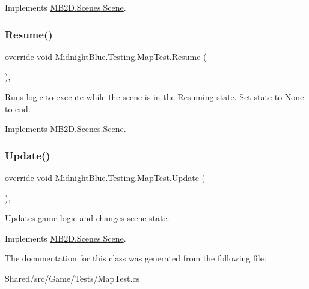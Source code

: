 Implements \hyperlink{class_m_b2_d_1_1_scenes_1_1_scene_a0661eff0223150fa8e9ea88145409e5d}{M\+B2\+D.\+Scenes.\+Scene}.

\hypertarget{class_midnight_blue_1_1_testing_1_1_map_test_aa595402e6d3702119877721f7cb3ab9f}{}\label{class_midnight_blue_1_1_testing_1_1_map_test_aa595402e6d3702119877721f7cb3ab9f} 
\subsubsection{\texorpdfstring{Resume()}{Resume()}}
{\footnotesize\ttfamily override void Midnight\+Blue.\+Testing.\+Map\+Test.\+Resume (\begin{DoxyParamCaption}{ }\end{DoxyParamCaption})\hspace{0.3cm}{\ttfamily [inline]}, {\ttfamily [virtual]}}



Runs logic to execute while the scene is in the Resuming state. Set state to None to end. 



Implements \hyperlink{class_m_b2_d_1_1_scenes_1_1_scene_ad13639db22b059a1b714eefd9d927735}{M\+B2\+D.\+Scenes.\+Scene}.

\hypertarget{class_midnight_blue_1_1_testing_1_1_map_test_ae4bb817dd9c5b55bd1d818de9f527c7c}{}\label{class_midnight_blue_1_1_testing_1_1_map_test_ae4bb817dd9c5b55bd1d818de9f527c7c} 
\subsubsection{\texorpdfstring{Update()}{Update()}}
{\footnotesize\ttfamily override void Midnight\+Blue.\+Testing.\+Map\+Test.\+Update (\begin{DoxyParamCaption}{ }\end{DoxyParamCaption})\hspace{0.3cm}{\ttfamily [inline]}, {\ttfamily [virtual]}}



Updates game logic and changes scene state. 



Implements \hyperlink{class_m_b2_d_1_1_scenes_1_1_scene_a779de7c1ab23b698dcde3a228324a991}{M\+B2\+D.\+Scenes.\+Scene}.



The documentation for this class was generated from the following file\+:\begin{DoxyCompactItemize}
\item 
Shared/src/\+Game/\+Tests/Map\+Test.\+cs\end{DoxyCompactItemize}
